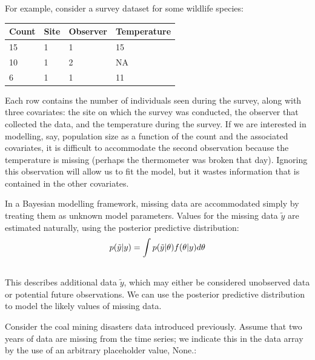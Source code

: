 \documentclass[letterpaper,10pt,english]{sphinxmanual}
\begin{document}
For example, consider a survey dataset for some wildlife species:

\begin{tabulary}{\linewidth}{|L|L|L|L|}
\hline
\textbf{
Count
} & \textbf{
Site
} & \textbf{
Observer
} & \textbf{
Temperature
}\\\hline

15
 & 
1
 & 
1
 & 
15
\\\hline

10
 & 
1
 & 
2
 & 
NA
\\\hline

6
 & 
1
 & 
1
 & 
11
\\\hline
\end{tabulary}


Each row contains the number of individuals seen during the survey, along with three covariates: the site on which the survey was conducted, the observer that collected the data, and the temperature during the survey. If we are interested in modelling, say, population size as a function of the count and the associated covariates, it is difficult to accommodate the second observation because the temperature is missing (perhaps the thermometer was broken that day). Ignoring this observation will allow us to fit the model, but it wastes information that is contained in the other covariates.

In a Bayesian modelling framework, missing data are accommodated simply by treating them as unknown model parameters. Values for the missing data $\tilde{y}$ are estimated naturally, using the posterior predictive distribution:
\begin{gather}
\begin{split}p(\tilde{y}|y) = \int p(\tilde{y}|\theta) f(\theta|y) d\theta\end{split}\notag\\\begin{split}\end{split}\notag
\end{gather}
This describes additional data $\tilde{y}$, which may either be considered unobserved data or potential future observations. We can use the posterior predictive distribution to model the likely values of missing data.

Consider the coal mining disasters data introduced previously. Assume that two years of data are missing from the time series; we indicate this in the data array by the use of an arbitrary placeholder value, None.:
\end{document}
